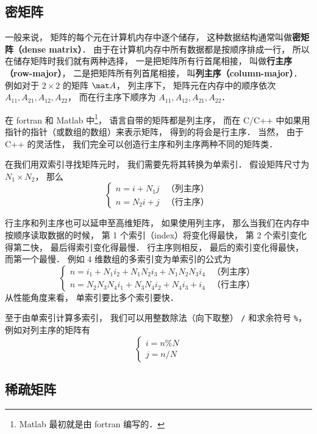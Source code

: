 
\begin{issues}
\issueTODO
\end{issues}

\subsection{密矩阵}
一般来说， 矩阵的每个元在计算机内存中逐个储存， 这种数据结构通常叫做\textbf{密矩阵（dense matrix）}． 由于在计算机内存中所有数据都是按顺序排成一行， 所以在储存矩阵时我们就有两种选择， 一是把矩阵所有行首尾相接， 叫做\textbf{行主序（row-major）}， 二是把矩阵所有列首尾相接， 叫\textbf{列主序（column-major）}． 例如对于 $2 \times 2$ 的矩阵 $\mat A$， 列主序下， 矩阵元在内存中的顺序依次 $A_{11}, A_{21}, A_{12}, A_{22}$， 而在行主序下顺序为 $A_{11},A_{12},A_{21},A_{22}$．

在 fortran 和 Matlab 中\footnote{Matlab 最初就是由 fortran 编写的．}， 语言自带的矩阵都是列主序， 而在 C/C++ 中如果用指针的指针（或数组的数组）来表示矩阵， 得到的将会是行主序． 当然， 由于 C++ 的灵活性， 我们完全可以创造行主序和列主序两种不同的矩阵类．

在我们用双索引寻找矩阵元时， 我们需要先将其转换为单索引． 假设矩阵尺寸为 $N_1 \times N_2$， 那么
\begin{equation}
\begin{cases}
n = i + N_1 j  &\text{（列主序）}\\
n = N_2 i + j  &\text{（行主序）}
\end{cases}
\end{equation}

行主序和列主序也可以延申至高维矩阵， 如果使用列主序， 那么当我们在内存中按顺序读取数据的时候， 第 1 个索引（index）将变化得最快， 第 2 个索引变化得第二快， 最后得索引变化得最慢． 行主序则相反， 最后的索引变化得最快， 而第一个最慢． 例如 4 维数组的多索引变为单索引的公式为
\begin{equation}
\begin{cases}
n = i_1 + N_1 i_2 + N_1 N_2 i_3 + N_1 N_2 N_3 i_4  &\text{（列主序）}\\
n = N_2 N_3 N_4 i_1 + N_3 N_4 i_2 + N_4 i_3 + i_4  &\text{（行主序）}
\end{cases}
\end{equation}
从性能角度来看， 单索引要比多个索引要快．

至于由单索引计算多索引， 我们可以用整数除法（向下取整） \verb|/| 和求余符号 \verb|%|， 例如对列主序的矩阵有
\begin{equation}
\begin{cases}
i = n \% N\\
j = n / N
\end{cases}
\end{equation}

\subsection{稀疏矩阵}
